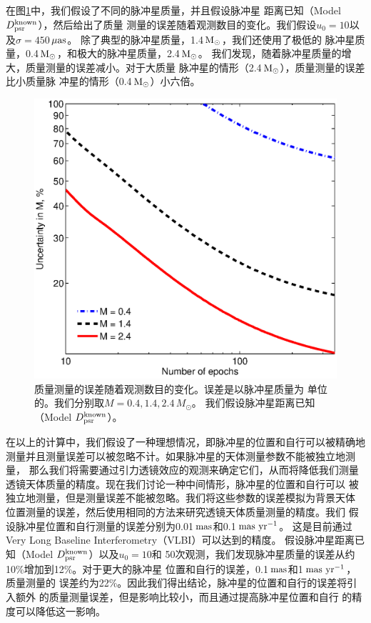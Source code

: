 在图\ref{masses}中，我们假设了不同的脉冲星质量，并且假设脉冲星
距离已知（Model $D_{\rm{psr}}^{\rm{known}}$），然后给出了质量
测量的误差随着观测数目的变化。我们假设$u_0=10$以及$\sigma=450$\,$\rm{\mu as}$。
除了典型的脉冲星质量，1.4\,$\rm{M_{\odot}}$，我们还使用了极低的
脉冲星质量，0.4\,$\rm{M_{\odot}}$，和极大的脉冲星质量，2.4\,$\rm{M_{\odot}}$。
我们发现，随着脉冲星质量的增大，质量测量的误差减小。对于大质量
脉冲星的情形（2.4\,$\rm{M_{\odot}}$），质量测量的误差比小质量脉
冲星的情形（0.4\,$\rm{M_{\odot}}$）小六倍。
%
\begin{figure}
\begin{center}
  \includegraphics[width=3.5 in,trim=0 0 0 3.2cm]{masses.eps}
%
\caption{质量测量的误差随着观测数目的变化。误差是以脉冲星质量为
单位的。我们分别取$M=0.4,1.4,2.4$\,$M_{\odot}$。
我们假设脉冲星距离已知（Model $D_{\rm{psr}}^{\rm{known}}$）。
}
\label{masses}
\end{center}
\end{figure}
%

在以上的计算中，我们假设了一种理想情况，即脉冲星的位置和自行可以被精确地
测量并且测量误差可以被忽略不计。如果脉冲星的天体测量参数不能被独立地测量，
那么我们将需要通过引力透镜效应的观测来确定它们，从而将降低我们测量
透镜天体质量的精度。现在我们讨论一种中间情形，脉冲星的位置和自行可以
被独立地测量，但是测量误差不能被忽略。我们将这些参数的误差模拟为背景天体
位置测量的误差，然后使用相同的方法来研究透镜天体质量测量的精度。我们
假设脉冲星位置和自行测量的误差分别为0.01\,$\rm{mas}$和0.1\,$\rm{mas\ yr^{-1}}$。
这是目前通过Very Long Baseline Interferometry（VLBI）可以达到的精度\supercite{deller}。
假设脉冲星距离已知（Model $D_{\rm{psr}}^{\rm{known}}$）以及$u_0=10$和
50次观测，我们发现脉冲星质量的误差从约10\%增加到12\%。对于更大的脉冲星
位置和自行的误差，0.1\,$\rm{mas}$和1\,$\rm{mas\ yr^{-1}}$，质量测量的
误差约为22\%。因此我们得出结论，脉冲星的位置和自行的误差将引入额外
的质量测量误差，但是影响比较小，而且通过提高脉冲星位置和自行
的精度可以降低这一影响。

